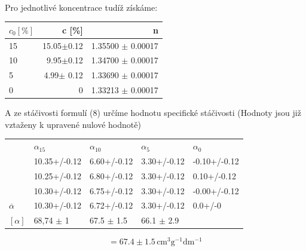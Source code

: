 \documentclass[czech,11pt,a4paper]{article}
\begin{document}
\begin{multicols}{2}
\begin{tabular}{l|l}
		\end{tabular}\\
		Pro jednotlivé koncentrace tudíž získáme:
		
		\begin{tabular}{l|rr}
			$c_0 [\%]$ & c [\%]               & n                       \\ \hline
			15  & 15.05$\pm$0.12  & 1.35500 $\pm $ 0.00017 \\
			10  & 9.95$\pm$0.12   & 1.34700 $\pm$ 0.00017  \\
			5   & 4.99$\pm$ 0.12 & 1.33690 $\pm$ 0.00017  \\
			0   & 0               & 1.33213 $\pm$ 0.00017 
		\end{tabular}
		
		A ze stáčivosti formulí (8) určíme hodnotu specifické stáčivosti (Hodnoty jsou již vztaženy k upravené nulové hodnotě)
		
	\begin{center}
			{\tiny \begin{tabular}{lllll}
		& $\alpha _{15}$  & $\alpha _{10}$   & $\alpha _{5}$    & $\alpha _{0}$  \\
		& 10.35+/-0.12  & 6.60+/-0.12    & 3.30+/-0.12    & -0.10+/-0.12 \\
		& 10.25+/-0.12  & 6.80+/-0.12    & 3.30+/-0.12    & 0.10+/-0.12  \\
		& 10.30+/-0.12  & 6.75+/-0.12    & 3.30+/-0.12    & -0.00+/-0.12 \\ \hline
		$\overline{\alpha}$& 10.30+/-0.12  & 6.72+/-0.12    & 3.30+/-0.12    & 0.0+/-0      \\ \hline \hline
		$ [\alpha] $ & 68,74 $\pm$ 1 & 67.5 $\pm$ 1.5 & 66.1 $\pm$ 2.9 &             
		\end{tabular}}
	
	\begin{equation}
		[\alpha] = 67.4 \pm 1.5 \,\mathrm{cm^3 g^{-1} dm^{-1} }
	\end{equation}
	

\end{center}
\end{multicols}
\end{document}
